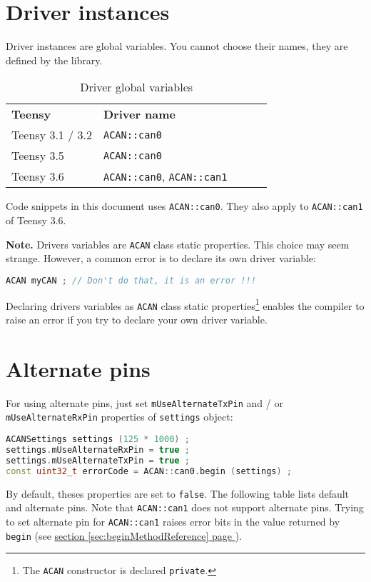 \documentclass[9pt, a4paper, obeyspaces, openany]{extarticle}
\newcommand \sectionLabel[2]{\section{#1}\label{sec:#2}}
\newcommand\refSectionPage[1]{\hyperref[sec:#1]{section \ref*{sec:#1} page \pageref{sec:#1}}}
\newcommand\labelTableau[1]{\label{tab:#1}}
\begin{document}
\sectionLabel{Driver instances}{driverInstances}

Driver instances are global variables. You cannot choose their names, they are defined by the library.

\begin{table}[htbp]
  \small
  \onehalfspacing
  \centering
  \begin{tabular}{lllll}
    \textbf{Teensy}& \textbf{Driver name} \\
    Teensy 3.1 / 3.2 & \texttt{ACAN::can0}\\
    Teensy 3.5 &  \texttt{ACAN::can0}\\
    Teensy 3.6 &  \texttt{ACAN::can0}, \texttt{ACAN::can1}\\
   \end{tabular}
  \caption{Driver global variables}
  \labelTableau{varGlobalePiloteFlexCAN}
\end{table}

Code snippets in this document uses \texttt{ACAN::can0}. They also apply to \texttt{ACAN::can1} of Teensy 3.6.

{\bf Note.} Drivers variables are \texttt{ACAN} class static properties. This choice may seem strange. However, a common error is to declare its own driver variable: 
{ \small\begin{lstlisting}[language=c++]
ACAN myCAN ; // Don't do that, it is an error !!!
\end{lstlisting}}

Declaring drivers variables as \texttt{ACAN} class static properties\footnote{The \texttt{ACAN} constructor is declared \texttt{private}.} enables the compiler to raise an error if you try to declare your own driver variable.



\sectionLabel{Alternate pins}{alternatePins}

For using alternate pins, just set \texttt{mUseAlternateTxPin} and / or \texttt{mUseAlternateRxPin} properties of \texttt{settings} object:

{ \small\begin{lstlisting}[language=c++]
ACANSettings settings (125 * 1000) ;
settings.mUseAlternateRxPin = true ;
settings.mUseAlternateTxPin = true ;
const uint32_t errorCode = ACAN::can0.begin (settings) ;
\end{lstlisting}}

By default, theses properties are set to \texttt{false}. The following table lists default and alternate pins. Note that \texttt{ACAN::can1} does not support alternate pins. Trying to set alternate pin for \texttt{ACAN::can1} raises error bits in the value returned by \texttt{begin} (see \refSectionPage{beginMethodReference}). 
\end{document}

